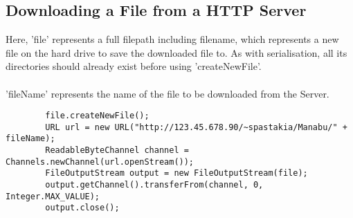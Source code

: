\documentclass[a4paper, 12pt]{article}
\begin{document}
\subsection{Downloading a File from a HTTP Server}
Here, 'file' represents a full filepath including filename, which represents a new file on the hard drive to save the downloaded file to. As with serialisation, all its directories should already exist before using 'createNewFile'.\\\\
'fileName' represents the name of the file to be downloaded from the Server.
\begin{lstlisting}
		file.createNewFile();
		URL url = new URL("http://123.45.678.90/~spastakia/Manabu/" + fileName);
		ReadableByteChannel channel = Channels.newChannel(url.openStream());
		FileOutputStream output = new FileOutputStream(file);
		output.getChannel().transferFrom(channel, 0, Integer.MAX_VALUE);
		output.close();
\end{lstlisting}
\end{document}
